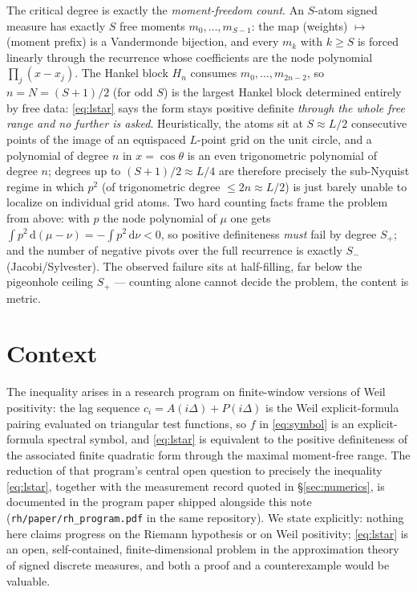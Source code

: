 \documentclass[11pt]{article}
\theoremstyle{remark}
\newcommand{\dd}{\,\mathrm{d}}
\begin{document}
The critical degree is exactly the \emph{moment-freedom count}.  An
$S$-atom signed measure has exactly $S$ free moments
$m_{0},\dots,m_{S-1}$: the map (weights) $\mapsto$ (moment prefix) is
a Vandermonde bijection, and every $m_{k}$ with $k\ge S$ is forced
linearly through the recurrence whose coefficients are the node
polynomial $\prod_{j}(x-x_{j})$.  The Hankel block $H_{n}$ consumes
$m_{0},\dots,m_{2n-2}$, so $n=N=(S+1)/2$ (for odd $S$) is the largest
Hankel block determined entirely by free data: \eqref{eq:lstar} says
the form stays positive definite \emph{through the whole free range
and no further is asked}.  Heuristically, the atoms sit at $S\approx
L/2$ consecutive points of the image of an equispaced $L$-point grid
on the unit circle, and a polynomial of degree $n$ in $x=\cos\theta$
is an even trigonometric polynomial of degree $n$; degrees up to
$(S+1)/2\approx L/4$ are therefore precisely the sub-Nyquist regime
in which $p^{2}$ (of trigonometric degree $\le 2n \approx L/2$) is
just barely unable to localize on individual grid atoms.  Two hard
counting facts frame the problem from above: with $p$ the node
polynomial of $\mu$ one gets $\int p^{2}\dd(\mu-\nu)=-\int
p^{2}\dd\nu<0$, so positive definiteness \emph{must} fail by degree
$S_{+}$; and the number of negative pivots over the full recurrence
is exactly $S_{-}$ (Jacobi/Sylvester).  The observed failure sits at
half-filling, far below the pigeonhole ceiling $S_{+}$ --- counting
alone cannot decide the problem, the content is metric.

\section{Context}\label{sec:context}

The inequality arises in a research program on finite-window versions
of Weil positivity: the lag sequence $c_{i}=A(i\Delta)+P(i\Delta)$ is
the Weil explicit-formula pairing evaluated on triangular test
functions, so $f$ in \eqref{eq:symbol} is an explicit-formula
spectral symbol, and \eqref{eq:lstar} is equivalent to the positive
definiteness of the associated finite quadratic form through the
maximal moment-free range.  The reduction of that program's central
open question to precisely the inequality \eqref{eq:lstar}, together
with the measurement record quoted in \S\ref{sec:numerics}, is
documented in the program paper shipped alongside this note
(\texttt{rh/paper/rh\_program.pdf} in the same repository).  We state
explicitly: nothing here claims progress on the Riemann hypothesis or
on Weil positivity; \eqref{eq:lstar} is an open, self-contained,
finite-dimensional problem in the approximation theory of signed
discrete measures, and both a proof and a counterexample would be
valuable.
\end{document}
